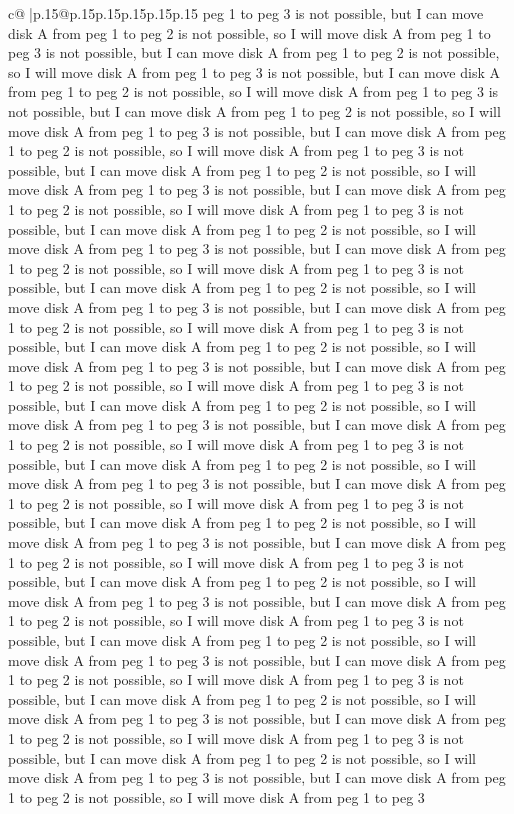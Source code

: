\documentclass{article}
\begin{document}
{\begin{supertabular}{c@{$\;$}|p{.15\linewidth}@{}p{.15\linewidth}p{.15\linewidth}p{.15\linewidth}p{.15\linewidth}p{.15\linewidth}}
{{{peg 1 to peg 3 is not possible, but I can move disk A from peg 1 to peg 2 is not possible, so I will move disk A from peg 1 to peg 3 is not possible, but I can move disk A from peg 1 to peg 2 is not possible, so I will move disk A from peg 1 to peg 3 is not possible, but I can move disk A from peg 1 to peg 2 is not possible, so I will move disk A from peg 1 to peg 3 is not possible, but I can move disk A from peg 1 to peg 2 is not possible, so I will move disk A from peg 1 to peg 3 is not possible, but I can move disk A from peg 1 to peg 2 is not possible, so I will move disk A from peg 1 to peg 3 is not possible, but I can move disk A from peg 1 to peg 2 is not possible, so I will move disk A from peg 1 to peg 3 is not possible, but I can move disk A from peg 1 to peg 2 is not possible, so I will move disk A from peg 1 to peg 3 is not possible, but I can move disk A from peg 1 to peg 2 is not possible, so I will move disk A from peg 1 to peg 3 is not possible, but I can move disk A from peg 1 to peg 2 is not possible, so I will move disk A from peg 1 to peg 3 is not possible, but I can move disk A from peg 1 to peg 2 is not possible, so I will move disk A from peg 1 to peg 3 is not possible, but I can move disk A from peg 1 to peg 2 is not possible, so I will move disk A from peg 1 to peg 3 is not possible, but I can move disk A from peg 1 to peg 2 is not possible, so I will move disk A from peg 1 to peg 3 is not possible, but I can move disk A from peg 1 to peg 2 is not possible, so I will move disk A from peg 1 to peg 3 is not possible, but I can move disk A from peg 1 to peg 2 is not possible, so I will move disk A from peg 1 to peg 3 is not possible, but I can move disk A from peg 1 to peg 2 is not possible, so I will move disk A from peg 1 to peg 3 is not possible, but I can move disk A from peg 1 to peg 2 is not possible, so I will move disk A from peg 1 to peg 3 is not possible, but I can move disk A from peg 1 to peg 2 is not possible, so I will move disk A from peg 1 to peg 3 is not possible, but I can move disk A from peg 1 to peg 2 is not possible, so I will move disk A from peg 1 to peg 3 is not possible, but I can move disk A from peg 1 to peg 2 is not possible, so I will move disk A from peg 1 to peg 3 is not possible, but I can move disk A from peg 1 to peg 2 is not possible, so I will move disk A from peg 1 to peg 3 is not possible, but I can move disk A from peg 1 to peg 2 is not possible, so I will move disk A from peg 1 to peg 3 is not possible, but I can move disk A from peg 1 to peg 2 is not possible, so I will move disk A from peg 1 to peg 3 is not possible, but I can move disk A from peg 1 to peg 2 is not possible, so I will move disk A from peg 1 to peg 3 is not possible, but I can move disk A from peg 1 to peg 2 is not possible, so I will move disk A from peg 1 to peg 3 is not possible, but I can move disk A from peg 1 to peg 2 is not possible, so I will move disk A from peg 1 to peg 3 is not possible, but I can move disk A from peg 1 to peg 2 is not possible, so I will move disk A from peg 1 to peg 3 is not possible, but I can move disk A from peg 1 to peg 2 is not possible, so I will move disk A from peg 1 to peg 3 }}}
\end{supertabular}}
\end{document}
